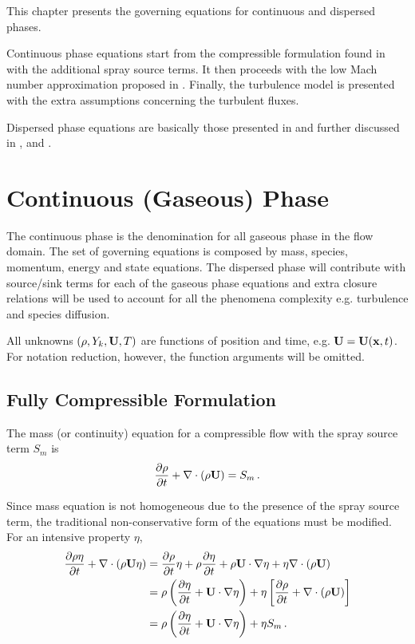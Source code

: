 
This chapter presents the governing equations for continuous and dispersed phases.

Continuous phase equations start from the compressible formulation found in \cite{poinsot2005theoretical} with the additional spray source terms. It then proceeds with the low Mach number approximation proposed in \cite{majda}. Finally, the turbulence model is presented with the extra assumptions concerning the turbulent fluxes.

Dispersed phase equations are basically those presented in \cite{nordin} and further discussed in \cite{vonkarman}, \cite{naca} and \cite{baumgarten2006mixture}.

\section{Continuous (Gaseous) Phase}

The continuous phase is the denomination for all gaseous phase in the flow
domain. The set of governing equations is composed by mass, species, momentum, energy
 and state equations. The dispersed phase will
contribute with source/sink terms for each of the gaseous phase equations and extra closure relations
will be used to account for all the phenomena complexity e.g. turbulence and
species diffusion.

All unknowns $(\rho, Y_k, \mathbf{U}, T)$ are functions of position and time, e.g.
$\mathbf{U}=\mathbf{U}(\mathbf{x},t)$. For notation reduction, however, the function
arguments will be omitted.

\subsection{Fully Compressible Formulation}

The mass (or continuity) equation for a compressible flow with the
spray source term $S_m$ is
\begin{equation}\label{ns: mass}
\frac{\partial \rho}{\partial t} + \nabla \cdot \left( \rho \bv{U} \right) =
S_m \, .
\end{equation}

\begin{remark}Since mass equation is not homogeneous due to the presence
of the spray source term, the traditional
non-conservative form of the equations must be modified. For an intensive
property $\eta$,
\begin{equation}
\begin{split}
 \frac{\partial \rho \eta}{\partial t} + \nabla \cdot \left( \rho \mathbf{U} \eta
\right) &= \frac{\partial \rho}{\partial t}\eta + \rho\frac{\partial
\eta}{\partial t} + \rho \mathbf{U} \cdot \nabla \eta + \eta \nabla \cdot \left(
\rho \mathbf{U} \right) \\
&= \rho \left( \frac{\partial \eta}{\partial t} + \mathbf{U} \cdot \nabla \eta
\right) + \eta \left[ \frac{\partial \rho}{\partial t} + \nabla \cdot \left(
\rho \mathbf{U} \right) \right]\\
&= \rho \left( \frac{\partial \eta}{\partial t} + \mathbf{U} \cdot \nabla \eta
\right) + \eta S_m \, .
\end{split}
\end{equation}
\end{remark}

